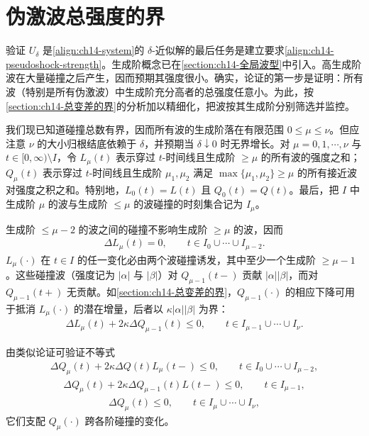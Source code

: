 \documentclass[../../main.tex]{subfiles}
\begin{document}
\section{伪激波总强度的界}\label{section:ch14-伪激波总强度的界}

验证 $U_\delta$ 是\eqref{align:ch14-system}的 $\delta$-近似解的最后任务是建立要求\eqref{align:ch14-pseudoshock-strength}。生成阶概念已在\cref{section:ch14-全局波型}中引入。高生成阶波在大量碰撞之后产生，因而预期其强度很小。确实，论证的第一步是证明：所有波（特别是所有伪激波）中生成阶充分高者的总强度任意小。为此，按\cref{section:ch14-总变差的界}的分析加以精细化，把波按其生成阶分别筛选并监控。

我们现已知道碰撞总数有界，因而所有波的生成阶落在有限范围 $0\leqslant\mu\leqslant\nu$。但应注意 $\nu$ 的大小归根结底依赖于 $\delta$，并预期当 $\delta\downarrow0$ 时无界增长。对 $\mu=0,1,\cdots,\nu$ 与 $t\in[0,\infty)\setminus I$，令 $L_\mu(t)$ 表示穿过 $t$-时间线且生成阶 $\geqslant\mu$ 的所有波的强度之和；$Q_\mu(t)$ 表示穿过 $t$-时间线且生成阶 $\mu_1,\mu_2$ 满足 $\max\{\mu_1,\mu_2\}\geqslant\mu$ 的所有接近波对强度之积之和。特别地，$L_0(t)=L(t)$ 且 $Q_0(t)=Q(t)$。最后，把 $I$ 中生成阶 $\mu$ 的波与生成阶 $\leqslant\mu$ 的波碰撞的时刻集合记为 $I_\mu$。

生成阶 $\leqslant\mu-2$ 的波之间的碰撞不影响生成阶 $\geqslant\mu$ 的波，因而
\begin{align}
\Delta L_\mu(t)=0,\qquad t\in I_0\cup\cdots\cup I_{\mu-2}.
\label{align:ch14-deltaLmu0}
\end{align}
$L_\mu(\cdot)$ 在 $t\in I$ 的任一变化必由两个波碰撞诱发，其中至少一个生成阶 $\geqslant\mu-1$。这些碰撞波（强度记为 $|\alpha|$ 与 $|\beta|$）对 $Q_{\mu-1}(t-)$ 贡献 $|\alpha||\beta|$，而对 $Q_{\mu-1}(t+)$ 无贡献。如\cref{section:ch14-总变差的界}，$Q_{\mu-1}(\cdot)$ 的相应下降可用于抵消 $L_\mu(\cdot)$ 的潜在增量，后者以 $\kappa|\alpha||\beta|$ 为界：
\begin{align}
\Delta L_\mu(t)+2\kappa\Delta Q_{\mu-1}(t)\leqslant0,\qquad t\in I_{\mu-1}\cup\cdots\cup I_\nu.
\label{align:ch14-deltaLmu}
\end{align}

由类似论证可验证不等式
\begin{align}
\Delta Q_\mu(t)+2\kappa\Delta Q(t)L_\mu(t-)\leqslant0,\qquad t\in I_0\cup\cdots\cup I_{\mu-2},
\label{align:ch14-deltaQmu1}
\end{align}
\begin{align}
\Delta Q_\mu(t)+2\kappa\Delta Q_{\mu-1}(t)L(t-)\leqslant0,\qquad t\in I_{\mu-1},
\label{align:ch14-deltaQmu2}
\end{align}
\begin{align}
\Delta Q_\mu(t)\leqslant0,\qquad t\in I_\mu\cup\cdots\cup I_\nu,
\label{align:ch14-deltaQmu3}
\end{align}
它们支配 $Q_\mu(\cdot)$ 跨各阶碰撞的变化。
\end{document}
